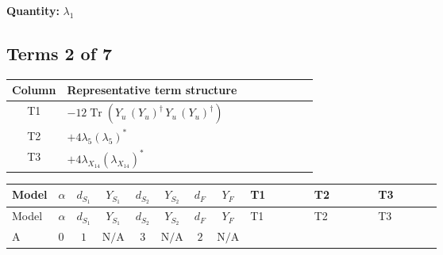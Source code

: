 \documentclass[8pt]{article}
\begin{document}
\begin{landscape}
\begin{longtable}{@{}llcccccc >{\raggedright\arraybackslash}p{0.21\linewidth} >{\raggedright\arraybackslash}p{0.21\linewidth} >{\raggedright\arraybackslash}p{0.21\linewidth}@{}}
\midrule
\bottomrule
\end{longtable}
\clearpage
\noindent\textbf{Quantity: }$\lambda_1$\par\smallskip
\subsection*{Terms 2 of 7}
\begin{center}
\begin{tabular}{@{}c >{\raggedright\arraybackslash}p{0.82\linewidth}@{}}
\toprule
Column & Representative term structure \\
\midrule
T1 & \(\displaystyle -12 \operatorname{Tr}\!\left({Y_u}\,\left({Y_u}\right)^{\dagger}\,{Y_u}\,\left({Y_u}\right)^{\dagger}\right)\) \\
\midrule
T2 & \(\displaystyle +4 {\lambda_5} \left({\lambda_5}\right)^{*}\) \\
\midrule
T3 & \(\displaystyle +4 {\lambda_{X_{14}}} \left({\lambda_{X_{14}}}\right)^{*}\) \\
\midrule
\bottomrule
\end{tabular}
\end{center}
\smallskip
\tiny
\begin{longtable}{@{}llcccccc >{\raggedright\arraybackslash}p{0.21\linewidth} >{\raggedright\arraybackslash}p{0.21\linewidth} >{\raggedright\arraybackslash}p{0.21\linewidth}@{}}
\toprule
Model & $\alpha$ & $d_{S_1}$ & $Y_{S_1}$ & $d_{S_2}$ & $Y_{S_2}$ & $d_F$ & $Y_F$ & T1 & T2 & T3 \\
\midrule
\endfirsthead
\toprule
Model & $\alpha$ & $d_{S_1}$ & $Y_{S_1}$ & $d_{S_2}$ & $Y_{S_2}$ & $d_F$ & $Y_F$ & T1 & T2 & T3 \\
\midrule
\endhead
A & $0$ & $1$ & $\text{N/A}$ & $3$ & $\text{N/A}$ & $2$ & $\text{N/A}$ & \scriptsize\adjustbox{max width=\linewidth}{$\begin{gathered} -12 \operatorname{Tr}\!\left({Y_u}\,\left({Y_u}\right)^{\dagger}\,{Y_u}\,\left({Y_u}\right)^{\dagger}\right)\end{gathered}$} & \scriptsize\adjustbox{max width=\linewidth}{$\begin{gathered} +4 {\lambda_5} \left({\lambda_5}\right)^{*}\end{gathered}$} & \scriptsize\adjustbox{max width=\linewidth}{$\begin{gathered} +4 {\lambda_{X_{14}}} \left({\lambda_{X_{14}}}\right)^{*} \\ +8 {\lambda_{X_{18}}} \left({\lambda_{X_{18}}}\right)^{*}\end{gathered}$} \\

\end{longtable}
\end{landscape}
\end{document}
